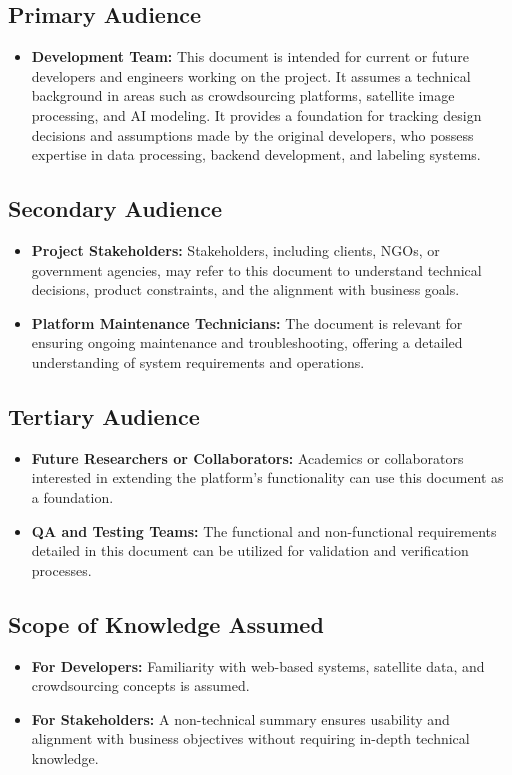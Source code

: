 \documentclass{article}
\begin{document}
\subsection{Primary Audience}
\begin{itemize}
    \item \textbf{Development Team:} This document is intended for current or future developers and engineers working on the project. It assumes a technical background in areas such as crowdsourcing platforms, satellite image processing, and AI modeling. It provides a foundation for tracking design decisions and assumptions made by the original developers, who possess expertise in data processing, backend development, and labeling systems.
\end{itemize}

\subsection{Secondary Audience}
\begin{itemize}
    \item \textbf{Project Stakeholders:} Stakeholders, including clients, NGOs, or government agencies, may refer to this document to understand technical decisions, product constraints, and the alignment with business goals.
    \item \textbf{Platform Maintenance Technicians:} The document is relevant for ensuring ongoing maintenance and troubleshooting, offering a detailed understanding of system requirements and operations.
\end{itemize}

\subsection{Tertiary Audience}
\begin{itemize}
    \item \textbf{Future Researchers or Collaborators:} Academics or collaborators interested in extending the platform’s functionality can use this document as a foundation.
    \item \textbf{QA and Testing Teams:} The functional and non-functional requirements detailed in this document can be utilized for validation and verification processes.
\end{itemize}

\subsection{Scope of Knowledge Assumed}
\begin{itemize}
    \item \textbf{For Developers:} Familiarity with web-based systems, satellite data, and crowdsourcing concepts is assumed.
    \item \textbf{For Stakeholders:} A non-technical summary ensures usability and alignment with business objectives without requiring in-depth technical knowledge.
\end{itemize}
\end{document}
